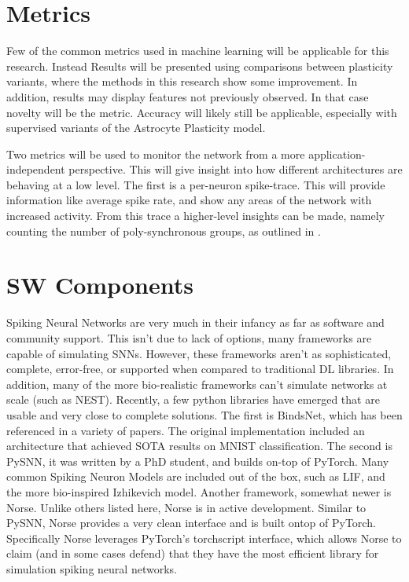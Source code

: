     \section{Metrics} \label{section:metrics}
    Few of the common metrics used in machine learning will be applicable for
    this research. Instead Results will be presented using comparisons between
    plasticity variants, where the methods in this research show some
    improvement. In addition, results may display features not previously
    observed. In that case novelty will be the metric. Accuracy will likely
    still be applicable, especially with supervised variants of the Astrocyte
    Plasticity model.
    
    Two metrics will be used to monitor the network from a more
    application-independent perspective. This will give insight into how
    different architectures are behaving at a low level. The first is a
    per-neuron spike-trace. This will provide information like average spike
    rate, and show any areas of the network with increased activity. From this
    trace a higher-level insights can be made, namely counting the number of
    poly-synchronous groups, as outlined in \cite{sgnn_transistor}.
    
    \section{SW Components}
    Spiking Neural Networks are very much in their infancy as far as software
    and community support. This isn't due to lack of options, many frameworks
    are capable of simulating SNNs. However, these frameworks aren't as
    sophisticated, complete, error-free, or supported when compared to
    traditional DL libraries. In addition, many of the more bio-realistic
    frameworks can't simulate networks at scale (such as NEST). Recently, a few
    python libraries have emerged that are usable and very close to complete
    solutions. The first is BindsNet, which has been referenced in a variety of
    papers. The original implementation included an architecture that achieved
    SOTA results on MNIST classification. The second is PySNN, it was written by
    a PhD student, and builds on-top of PyTorch. Many common Spiking Neuron
    Models are included out of the box, such as LIF, and the more bio-inspired
    Izhikevich model. Another framework, somewhat newer is Norse. Unlike others
    listed here, Norse is in active development. Similar to PySNN, Norse
    provides a very clean interface and is built ontop of PyTorch. Specifically
    Norse leverages PyTorch's torchscript interface, which allows Norse to claim
    (and in some cases defend) that they have the most efficient library for
    simulation spiking neural networks.

